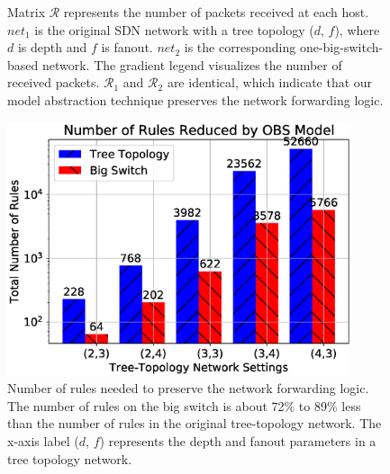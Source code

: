 \begin{figure}[ht]
{                \label{OBS:Fig:PingMatrix3}
            }
        \caption[Forwarding Logic Evaluation after One-Big-Switch Abstraction]{
            Matrix $\mathcal{R}$ represents the number of packets received at each host.
        $net_1$ is the original SDN network with a tree topology ($d$, $f$),
        where $d$ is depth and $f$ is fanout.
        $net_2$ is the corresponding one-big-switch-based network.
        The gradient legend visualizes the number of received packets.
        $\mathcal{R}_1$ and $\mathcal{R}_2$ are identical,
        which indicate that our model abstraction technique preserves the network forwarding logic.}
    \label{OBS:Fig:ComparePingMatrix}
\end{figure}

\begin{figure}[ht]
    \centering
    \includegraphics[width=0.9\textwidth]{OneBigSwitch/figures/comp_num_rules.eps}
    \caption[Number of Rules Reduced after One-Big-Switch Abstraction]{Number of rules needed to preserve the network forwarding logic.
        The number of rules on the big switch is about 72\% to 89\% less than
        the number of rules in the original tree-topology network.
        The x-axis label ($d$, $f$) represents the depth and fanout parameters
        in a tree topology network.}
    \label{OBS:Fig:CompareNumRules}
\end{figure}


